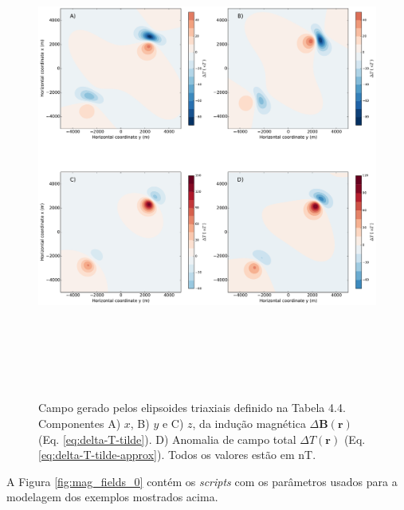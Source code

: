\begin{figure}[hbt!]
	\centering \includegraphics[width=16cm,height=16cm]{figures/ellipsoid_triaxial_multi}
	\caption[Campo gerado pelos elipsoides triaxiais definido na Tabela 4.4. Componentes A) $x$, B) $y$ e C) $z$ da indução magnética $\Delta \mathbf{B}(\mathbf{r})$ (Eq. \ref{eq:delta-T-tilde}). D) Anomalia de campo total $\Delta T (\mathbf{r})$ (Eq. \ref{eq:delta-T-tilde-approx}). Todos os valores estão em nT.]{Campo gerado pelos elipsoides triaxiais definido na Tabela 4.4. Componentes A) $x$, B) $y$ e C) $z$, da indução magnética $\Delta \mathbf{B}(\mathbf{r})$ (Eq. \ref{eq:delta-T-tilde}). D) Anomalia de campo total $\Delta T (\mathbf{r})$ (Eq. \ref{eq:delta-T-tilde-approx}). Todos os valores estão em nT.}
	\label{fig:ellipsoid_triaxial_multi}
\end{figure}


A Figura \ref{fig:mag_fields_0} contém os \textit{scripts} com os parâmetros usados para a modelagem dos exemplos mostrados acima.

